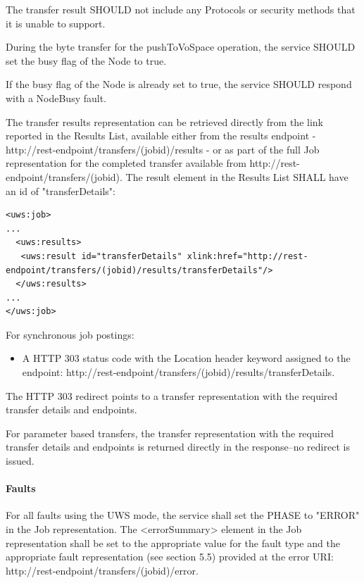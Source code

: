 \documentclass[11pt,a4paper]{ivoa}
\begin{document}
The transfer result SHOULD not include any Protocols or security methods that it is unable to support.

During the byte transfer for the pushToVoSpace operation, the service SHOULD set the busy flag of the Node to true.

If the busy flag of the Node is already set to true, the service SHOULD respond with a NodeBusy fault.

The transfer results representation can be retrieved directly from the link reported in the Results List, available either from the results endpoint - http://rest-endpoint/transfers/(jobid)/results - or as part of the full Job representation for the completed transfer available from http://rest-endpoint/transfers/(jobid). The result element in the Results List SHALL have an id of "transferDetails":
\begin{lstlisting}
<uws:job>
...
  <uws:results>
   <uws:result id="transferDetails" xlink:href="http://rest-endpoint/transfers/(jobid)/results/transferDetails"/>
  </uws:results>
...
</uws:job>
\end{lstlisting}
For synchronous job postings:
\begin{itemize}
    \item A HTTP 303 status code with the Location header keyword assigned to the endpoint: http://rest-endpoint/transfers/(jobid)/results/transferDetails.
\end{itemize}
The HTTP 303 redirect points to a transfer representation with the required transfer details and endpoints.

For parameter based transfers, the transfer representation with the required transfer details and endpoints is returned directly in the response--no redirect is issued.

\paragraph{Faults}
For all faults using the UWS mode, the service shall set the PHASE to "ERROR" in the Job representation. The <errorSummary> element in the Job representation shall be set to the appropriate value for the fault type and the appropriate fault representation (see section 5.5) provided at the error URI: http://rest-endpoint/transfers/(jobid)/error.
\end{document}
